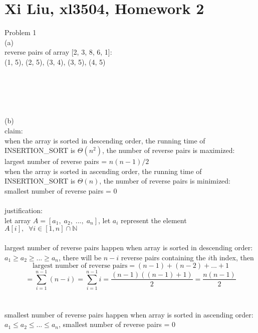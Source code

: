 \documentclass[12pt,border=4pt,multi]{article}%
\begin{document}
\section*{Xi Liu, xl3504, Homework 2}
Problem 1\\
(a)\\
reverse pairs of array [2, 3, 8, 6, 1]:\\
(1, 5), (2, 5), (3, 4), (3, 5), (4, 5)\\
\\
\\
\\
\\
\\
(b)\\
claim:\\
when the array is sorted in descending order, the running time of INSERTION\_SORT is $\Theta(n^2)$, the number of reverse pairs is maximized: largest number of reverse pairs = $n(n - 1) / 2$\\
when the array is sorted in ascending order, the running time of INSERTION\_SORT is $\Theta(n)$, the number of reverse pairs is minimized: smallest number of reverse pairs = 0\\
\\
justification:\\
let array $A = [a_1,\; a_2,\; ...,\; a_n]$, let $a_i$ represent the element $A[i],\;\;\forall i \in [1, n] \cap \mathbb{N}$\\
\\
largest number of reverse pairs happen when array is sorted in descending order: $a_1 \geq a_2 \geq ... \geq a_n$, there will be $n - i$ reverse pairs containing the $i$th index, then
\[\text{largest number of reverse pairs} = (n - 1) + (n - 2) + ... + 1\]
\[= \sum_{i = 1}^{n - 1} (n - i) = \sum_{i = 1}^{n - 1} i = \frac{(n - 1)((n - 1) + 1)}{2} = \frac{n(n - 1)}{2}\]
\\
\\
smallest number of reverse pairs happen when array is sorted in ascending order: $a_1 \leq a_2 \leq ... \leq a_n$, smallest number of reverse pairs = 0\\
\\
\\
\\
\\
\end{document}
